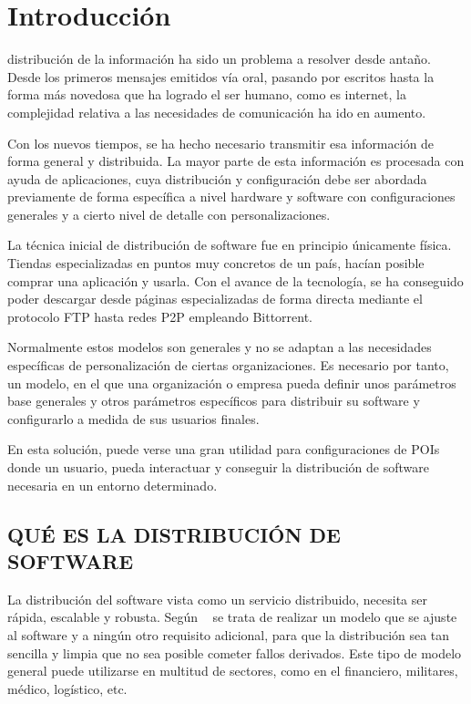 \mainmatter
\chapter{Introducción}
\thispagestyle{fancy}
\setcounter{page}{1}

  distribución de la información ha sido un problema a resolver
desde antaño. Desde los primeros mensajes emitidos vía oral, pasando
por escritos hasta la forma más novedosa que ha logrado el ser humano, como
es internet, la complejidad relativa a las necesidades de comunicación ha ido en
aumento.

Con los nuevos tiempos, se ha hecho necesario transmitir esa información de
forma general y distribuida. La mayor parte de esta información es
procesada con ayuda de aplicaciones, cuya distribución y
configuración debe ser abordada previamente de forma específica a
nivel hardware y software con configuraciones generales y a cierto nivel de
detalle con personalizaciones.

La técnica inicial de distribución de software fue en principio únicamente
física. Tiendas especializadas en puntos muy concretos de un país, hacían
posible comprar una aplicación y usarla.
\acresetall
Con el avance de la tecnología, se ha conseguido poder descargar desde páginas
especializadas de forma directa mediante el protocolo \acs{FTP}\label{acro:FTP}
hasta redes \acs{P2P}\label{acro:P2P} empleando Bittorrent.

Normalmente estos modelos son generales y no se adaptan a las necesidades
específicas de personalización de ciertas organizaciones. Es necesario por
tanto, un modelo, en el que una organización o empresa pueda definir unos 
parámetros base generales y otros parámetros específicos para distribuir 
su software y configurarlo a medida de sus usuarios finales.

En esta solución, puede verse una gran utilidad para configuraciones de
\acs{POI}\label{acro:POI}s donde un usuario, pueda interactuar y conseguir
la distribución de software necesaria en un entorno determinado.

\newpage

\section{\uppercase{Qué es la distribución de software}}

La distribución del software vista como un servicio distribuido, necesita ser
rápida, escalable y robusta. Según ~\cite{LiB11} se trata de realizar
un modelo que se ajuste al software y a ningún otro requisito adicional, para
que la distribución sea tan sencilla y limpia que no sea posible cometer fallos
derivados. Este tipo de modelo general puede utilizarse en multitud de sectores,
como en el financiero, militares, médico, logístico, etc.

